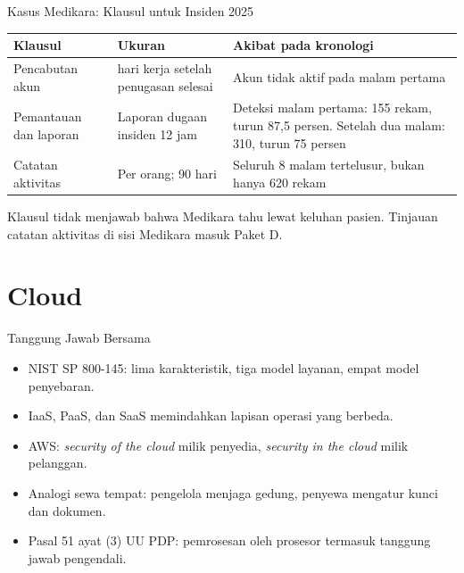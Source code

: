 \documentclass[aspectratio=169, table, 12pt]{beamer}
\begin{document}
\begin{frame}{{\Large Kasus Medikara: Klausul untuk Insiden 2025}}
  \vspace{2pt}
  \scriptsize
  \begin{tabularx}{\textwidth}{|>{\raggedright\arraybackslash}p{}|>{\raggedright\arraybackslash}p{}|>{\raggedright\arraybackslash}X|}
    \hline
    \textbf{Klausul} & \textbf{Ukuran} & \textbf{Akibat pada kronologi} \\ \hline
    Pencabutan akun & 1 hari kerja setelah penugasan selesai & Akun tidak aktif pada malam pertama
    \\ \hline
    Pemantauan dan laporan & Laporan dugaan insiden 12 jam & Deteksi malam pertama: 155 rekam, turun
    87,5 persen. Setelah dua malam: 310, turun 75 persen \\ \hline
    Catatan aktivitas & Per orang; 90 hari & Seluruh 8 malam tertelusur, bukan hanya 620 rekam \\
    \hline
  \end{tabularx}

  \vspace{8pt}
  \small Klausul tidak menjawab bahwa Medikara tahu lewat keluhan pasien. Tinjauan catatan aktivitas
  di sisi Medikara masuk Paket D.
\end{frame}

\section{Cloud}

\begin{frame}{{\Large Tanggung Jawab Bersama}}
  \vspace{6pt}
  \small
  \begin{itemize}
    \item NIST SP 800-145: lima karakteristik, tiga model layanan, empat model penyebaran.
    \item IaaS, PaaS, dan SaaS memindahkan lapisan operasi yang berbeda.
    \item AWS: \textit{security of the cloud} milik penyedia, \textit{security in the cloud} milik
          pelanggan.
    \item Analogi sewa tempat: pengelola menjaga gedung, penyewa mengatur kunci dan dokumen.
    \item Pasal 51 ayat (3) UU PDP: pemrosesan oleh prosesor termasuk tanggung jawab pengendali.
  \end{itemize}
\end{frame}
\end{document}
